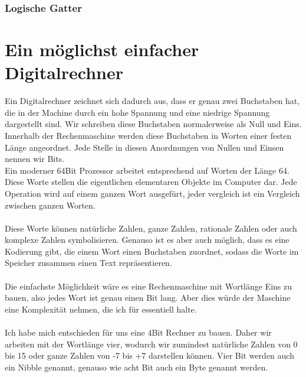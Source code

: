 \documentclass[11pt,a4paper,leqno]{report}
\numberwithin{equation}{chapter}
\begin{document}
\subsection{Logische Gatter}


\chapter{Ein m\"oglichst einfacher Digitalrechner}
Ein Digitalrechner zeichnet sich dadurch aus, dass er genau zwei Buchstaben hat, die in der Machine durch ein hohe Spannung und eine niedrige Spannung dargestellt sind. Wir schreiben diese Buchstaben normalerweise als Null und Eins.\\
Innerhalb der Rechenmaschine werden diese Buchstaben in Worten einer festen L\"ange angeordnet. Jede Stelle in diesen Anordnungen von Nullen und Einsen nennen wir Bits.\\
Ein moderner 64Bit Prozessor arbeitet entsprechend auf Worten der L\"ange 64. Diese Worte stellen die eigentlichen elementaren Objekte im Computer dar. Jede Operation wird auf einem ganzen Wort ausgef\"urt, jeder vergleich ist ein Vergleich zwischen ganzen Worten.\\
\\
Diese Worte k\"onnen nat\"urliche Zahlen, ganze Zahlen, rationale Zahlen oder auch komplexe Zahlen symbolisieren. Genauso ist es aber auch m\"oglich, dass es eine Kodierung gibt, die einem Wort einen Buchstaben zuordnet, sodass die Worte im Speicher zusammen einen Text repr\"asentieren.\\
\\
Die einfachste M\"oglichkeit w\"are es eine Rechenmaschine mit Wortl\"ange Eins zu bauen, also jedes Wort ist genau einen Bit lang. Aber dies w\"urde der Maschine eine Komplexit\"at nehmen, die ich f\"ur essentiell halte.\\
\\
Ich habe mich entschieden f\"ur uns eine 4Bit Rechner zu bauen. Daher wir arbeiten mit der Wortl\"ange vier, wodurch wir zumindest nat\"urliche Zahlen von 0 bis 15 oder ganze Zahlen von -7 bis +7 darstellen k\"onnen. Vier Bit werden auch ein Nibble genannt, genauso wie acht Bit auch ein Byte genannt werden.\\
\\
\end{document}
